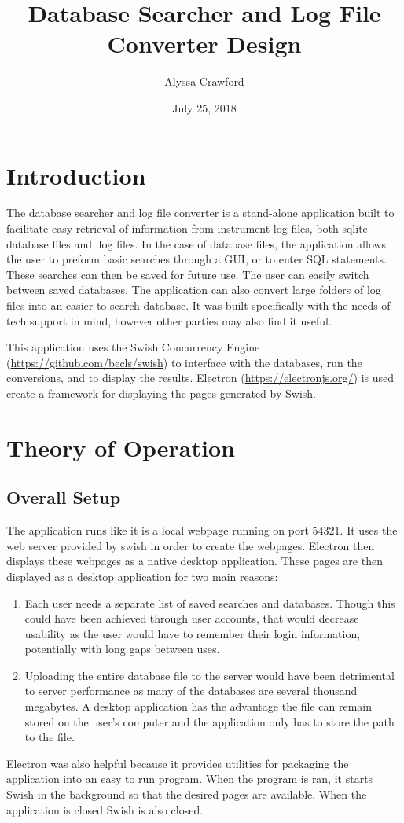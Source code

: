 \documentclass[letterpaper,11pt,twoside,final]{article}
\begin{document}
\title{Database Searcher and Log File Converter Design}
\author{Alyssa Crawford}
\date{July 25, 2018}
\coverpage

\section*{Introduction}
The database searcher and log file converter is a stand-alone
application built to facilitate easy retrieval of information from instrument
log files, both sqlite database files and .log files. In the case of
database files, the application allows the user to preform basic
searches through a GUI, or to enter SQL statements. These searches can
then be saved for future use. The user can easily switch between saved
databases. The application can
also convert large folders of log files into an easier to search database.
It was built specifically with the
needs of tech support in mind, however other parties may also find it
useful.

This application uses the Swish Concurrency Engine (\url{https://github.com/becls/swish}) to interface with
the databases, run the conversions, and to display the
results. Electron (\url{https://electronjs.org/}) is used create a framework for displaying the pages generated by Swish.  

\section*{Theory of Operation}
\subsection*{Overall Setup}
The application runs like it is a local webpage running on port 54321.
It uses the web server provided by swish in order to
create the webpages. Electron then displays these webpages as a native
desktop application. These pages are then displayed as a desktop
application for two main reasons:
\begin{enumerate}
  \item Each user needs a separate list of saved searches and
    databases. Though this could have been achieved through user
    accounts, that would decrease usability as the user would have to
    remember their login information, potentially with long gaps between
    uses.
  \item Uploading the entire database file to the server would have
    been detrimental to server performance as many of the databases
    are several thousand megabytes. A desktop application has the
    advantage the file can remain stored on the user's computer and
    the application only has to store the path to the file.
\end{enumerate}
Electron was also helpful because it provides utilities for packaging
the application into an easy to run program. When the program is ran, it starts Swish in the
background so that the desired pages are available. When the
application is closed Swish is also closed.
\end{document}
